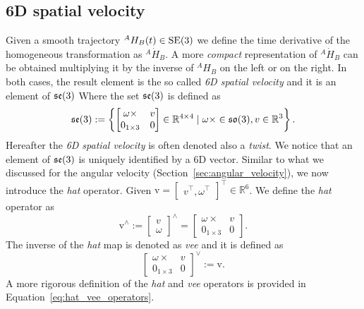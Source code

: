 \subsection{6D spatial velocity\label{sec:se3_velocity}}
Given a smooth trajectory ${}^A H_B {}(t) \in {\mathrm{SE}}(3)$ we define the time derivative of the homogeneous transformation as ${}^A {\dot H}_B$. A more \emph{compact} representation of 
${}^A {\dot H}_B$ can be obtained
multiplying it by the inverse of ${}^A H_B$ on the left or on the right.
In both cases, the result element is the so called \emph{6D spatial velocity} and it is an element of $\mathfrak{se}(3)$
Where the set $\mathfrak{se}(3)$ is defined as
\begin{equation}
\mathfrak{se}(3) :=  
\left\{ 
\begin{bmatrix} \omega \times & v \\ 0_{1\times3} & 0 \end{bmatrix} \in \mathbb{R}^{4 \times 4}  \mid \omega \times \in \mathfrak{so}(3), v \in \mathbb{R}^3 
\right\}.
\end{equation} 
Hereafter the \emph{6D spatial velocity} is often denoted also a \emph{twist}.
We notice that an element of $\mathfrak{se}(3)$ is uniquely identified by a 6D vector. Similar to what we discussed for the angular velocity (Section~\ref{sec:angular_velocity}), we now introduce the \emph{hat} operator. Given $\mathrm{v} = \begin{bmatrix}v^\top ,  \omega^\top  \end{bmatrix}^\top \in \mathbb{R}^6$. We define the \emph{hat} operator as 
\begin{equation}
    \mathrm{v} ^\wedge := \begin{bmatrix}
     v \\
     \omega
    \end{bmatrix}  ^\wedge =  \begin{bmatrix} \omega \times & v \\ 0_{1\times3} & 0 \end{bmatrix}.
\end{equation}
The inverse of the \emph{hat} map is denoted as \emph{vee} and it is defined as
\begin{equation}
    \begin{bmatrix} \omega \times & v \\ 0_{1\times3} & 0 \end{bmatrix}^\vee := \mathrm{v}.
\end{equation}
A more rigorous definition of the \emph{hat} and \emph{vee} operators is provided in Equation~\eqref{eq:hat_vee_operators}.
